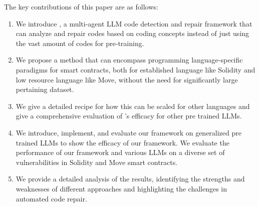 The key contributions of this paper are as follows:
\begin{enumerate}
    \item We introduce \sln{}, a multi-agent LLM code detection and repair framework that can analyze and repair codes based on coding concepts instead of just using the vast amount of codes for pre-training.
    \item We propose a method that can encompass programming language-specific paradigms for smart contracts, both for established language like Solidity and low resource language like Move, without the need for significantly large pertaining dataset. 
    \item We give a detailed recipe for how this can be scaled for other languages and give a comprehensive evaluation of \sln{}'s efficacy for other pre trained LLMs.
    \item We introduce, implement, and evaluate our framework on generalized pre trained LLMs to show the efficacy of our framework. We evaluate the performance of our framework and various LLMs on a diverse set of vulnerabilities in Solidity and Move smart contracts.
    \item We provide a detailed analysis of the results, identifying the strengths and weaknesses of different approaches and highlighting the challenges in automated code repair.
\end{enumerate}
